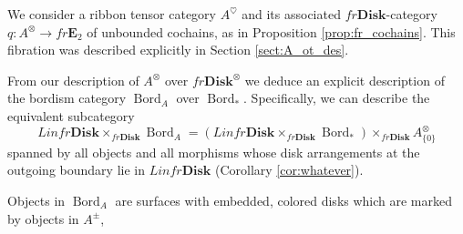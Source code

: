 \documentclass[reqno]{amsart}
\theoremstyle{definition}
\newcommand{\ot}{\otimes}
\newcommand{\E}{\mathbf{E}}
\newcommand{\Disk}{\mathbf{Disk}}
\DeclareMathOperator{\Bord}{Bord}
\renewcommand{\1}{\mathbf{1}}
\begin{document}
We consider a ribbon tensor category $A^{\heartsuit}$ and its associated $fr\Disk$-category $q:A^{\ot}\to fr\E_2$ of unbounded cochains, as in Proposition \ref{prop:fr_cochains}. This fibration was described explicitly in Section \ref{sect:A_ot_des}.
\par

From our description of $A^{\ot}$ over $fr\Disk^{\ot}$ we deduce an explicit description of the bordism category $\Bord_A$ over $\Bord_{\ast}$.  Specifically, we can describe the equivalent subcategory
\[
Linfr\Disk\times_{fr\Disk}\Bord_{A}=(Linfr\Disk\times_{fr\Disk}\Bord_{\ast})\times_{fr\Disk}A^{\ot}_{\{0\}}
\]
spanned by all objects and all morphisms whose disk arrangements at the outgoing boundary lie in $Linfr\Disk$ (Corollary \ref{cor:whatever}).

Objects in $\Bord_A$ are surfaces with embedded, colored disks which are marked by objects in $A^{\pm}$,
\end{document}
